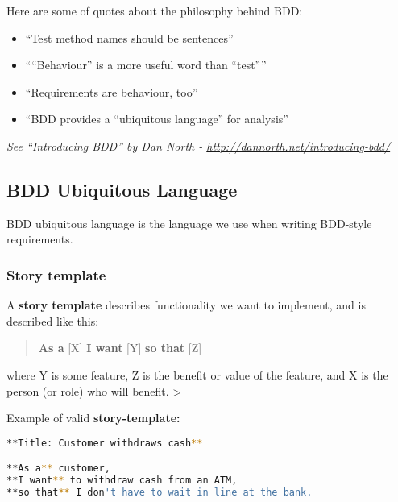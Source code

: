 \pagebreak




Here are some of quotes about the philosophy behind BDD:

\begin{itemize}
\tightlist
\item
  ``Test method names should be sentences''
\item
  ````Behaviour'' is a more useful word than ``test''''
\item
  ``Requirements are behaviour, too''
\item
  ``BDD provides a ``ubiquitous language'' for analysis''
\end{itemize}

\emph{See ``Introducing BDD'' by Dan North -
\url{http://dannorth.net/introducing-bdd/}}

\hypertarget{bdd-ubiquitous-language}{%
\subsection{BDD Ubiquitous Language}\label{bdd-ubiquitous-language}}

BDD ubiquitous language is the language we use when writing BDD-style
requirements.

\hypertarget{story-template}{%
\subsubsection{Story template}\label{story-template}}

A \textbf{story template} describes functionality we want to implement,
and is described like this:

\begin{quote}
\textbf{As a} {[}X{]} \textbf{I want} {[}Y{]} \textbf{so that} {[}Z{]}
\end{quote}

where Y is some feature, Z is the benefit or value of the feature, and X
is the person (or role) who will benefit. \textgreater{}

Example of valid \textbf{story-template:}

\begin{lstlisting}[language=bash]
**Title: Customer withdraws cash**

**As a** customer,
**I want** to withdraw cash from an ATM,
**so that** I don't have to wait in line at the bank.
\end{lstlisting}

